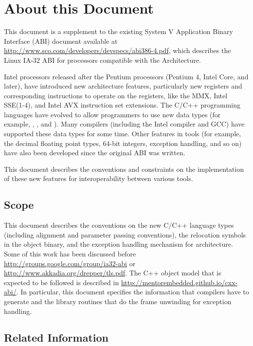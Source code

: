 \chapter{About this Document\label{intro}}

This document is a supplement to the existing \xARCH System V
Application Binary Interface (ABI) document available at
\url{http://www.sco.com/developers/devspecs/abi386-4.pdf},
which describes the Linux IA-32 ABI for processors compatible with the
\xARCH Architecture.

Intel processors released after the Pentium processors (Pentium 4,
Intel Core, and later), have introduced new architecture features,
particularly new registers and corresponding instructions to operate on
the registers, like the MMX, Intel SSE(1-4), and Intel AVX instruction
set extensions. The C/C++ programming languages have evolved to allow
programmers to use new data types (for example, ,
, and ). Many compilers (including the Intel
compiler and GCC) have supported these data types for some time. Other
features in tools (for example, the decimal floating point types, 64-bit
integers, exception handling, and so on) have also been developed since
the original ABI was written.

This document describes the conventions and constraints on the
implementation of these new features for interoperability between
various tools.

\section{Scope}

This document describes the conventions on the new C/C++ language types
(including alignment and parameter passing conventions), the relocation
symbols in the object binary, and the exception handling mechanism for
\xARCH architecture.  Some of this work has been discussed before
\url{http://groups.google.com/group/ia32-abi} or
\url{http://www.akkadia.org/drepper/tls.pdf}. The C++ object model that
is expected to be followed is described in
\url{http://mentorembedded.github.io/cxx-abi/}.  In particular,
this document specifies the information that compilers have to generate
and the library routines that do the frame unwinding for exception
handling.

\section{Related Information}

